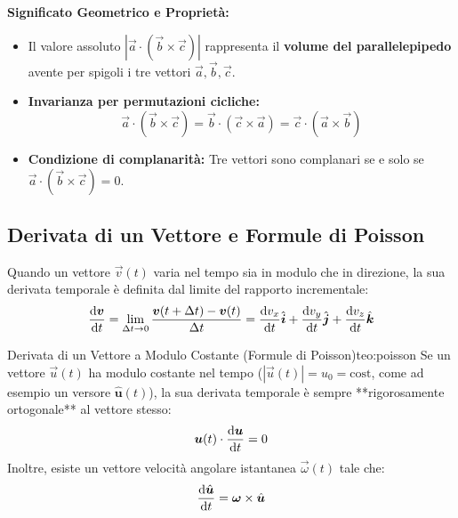 \textbf{Significato Geometrico e Proprietà:}
\begin{itemize}
    \item Il valore assoluto $|\vec{a}\cdot(\vec{b}\times\vec{c})|$ rappresenta il \textbf{volume del parallelepipedo} avente per spigoli i tre vettori $\vec{a}, \vec{b}, \vec{c}$.
    \item \textbf{Invarianza per permutazioni cicliche:}
    \begin{equation}
        \vec{a}\cdot(\vec{b}\times\vec{c}) = \vec{b}\cdot(\vec{c}\times\vec{a}) = \vec{c}\cdot(\vec{a}\times\vec{b})
    \end{equation}
    \item \textbf{Condizione di complanarità:} Tre vettori sono complanari se e solo se $\vec{a}\cdot(\vec{b}\times\vec{c}) = 0$.
\end{itemize}

\subsection{Derivata di un Vettore e Formule di Poisson}

Quando un vettore $\vec{v}(t)$ varia nel tempo sia in modulo che in direzione, la sua derivata temporale è definita dal limite del rapporto incrementale:
\begin{equation}
    \frac{\mathrm{d} \bm{v}}{\mathrm{d} t} = \lim_{\Delta t \to 0} \frac{\bm{v}(t+\Delta t) - \bm{v}(t)}{\Delta t} = \frac{\mathrm{d} v_x}{\mathrm{d} t}\hat{\bm{i}} + \frac{\mathrm{d} v_y}{\mathrm{d} t}\hat{\bm{j}} + \frac{\mathrm{d} v_z}{\mathrm{d} t}\hat{\bm{k}}
\end{equation}

\begin{teorema}{Derivata di un Vettore a Modulo Costante (Formule di Poisson)}{teo:poisson}
Se un vettore $\vec{u}(t)$ ha modulo costante nel tempo ($|\vec{u}(t)| = u_0 = \text{cost}$, come ad esempio un versore $\hat{\bm{u}}(t)$), la sua derivata temporale è sempre **rigorosamente ortogonale** al vettore stesso:
\begin{equation}
    \bm{u}(t)\cdot\frac{\mathrm{d} \bm{u}}{\mathrm{d} t} = 0
\end{equation}
Inoltre, esiste un vettore velocità angolare istantanea $\vec{\omega}(t)$ tale che:
\begin{equation}
    \frac{\mathrm{d} \hat{\bm{u}}}{\mathrm{d} t} = \bm{\omega} \times \hat{\bm{u}}
    \label{eq:poisson_versore}
\end{equation}
\end{teorema}

